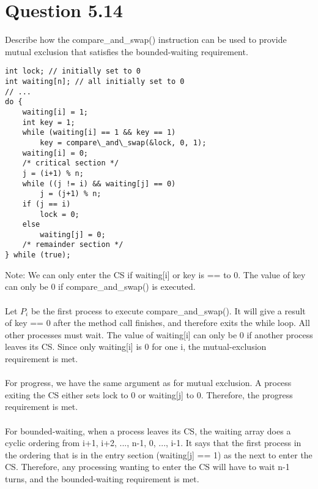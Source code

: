 \documentclass[12pt]{article}
\begin{document}
\section*{Question 5.14} {\color{blue}Describe how the compare\_and\_swap() instruction can be used to provide mutual exclusion that satisfies the bounded-waiting requirement.}
\\
\begin{lstlisting}
int lock; // initially set to 0
int waiting[n]; // all initially set to 0
// ...
do {
	waiting[i] = 1;
	int key = 1;
	while (waiting[i] == 1 && key == 1)
		key = compare\_and\_swap(&lock, 0, 1);
	waiting[i] = 0;
	/* critical section */
	j = (i+1) % n;
	while ((j != i) && waiting[j] == 0)
		j = (j+1) % n;
	if (j == i)
		lock = 0;
	else
		waiting[j] = 0;
	/* remainder section */
} while (true);
\end{lstlisting}

\noindent Note: We can only enter the CS if waiting[i] or key is == to 0. The value of key can only be 0 if compare\_and\_swap() is executed. 
\\ \\
Let $P_{i}$ be the first process to execute compare\_and\_swap(). It will give a result of key == 0 after the method call finishes, and therefore exits the while loop. All other processes must wait. The value of waiting[i] can only be 0 if another process leaves its CS. Since only waiting[i] is 0 for one i, the mutual-exclusion requirement is met.
\\ \\
For progress, we have the same argument as for mutual exclusion. A process exiting the CS either sets lock to 0 or waiting[j] to 0. Therefore, the progress requirement is met.
\\ \\
For bounded-waiting, when a process leaves its CS, the waiting array does a cyclic ordering from i+1, i+2, ..., n-1, 0, ..., i-1. It says that the first process in the ordering that is in the entry section (waiting[j] == 1) as the next to enter the CS. Therefore, any processing wanting to enter the CS will have to wait n-1 turns, and the bounded-waiting requirement is met. 
\end{document}
